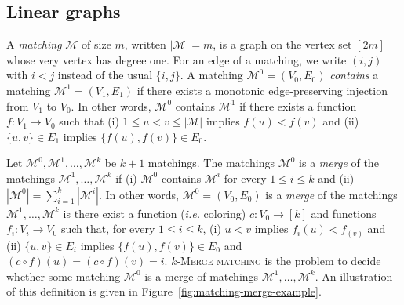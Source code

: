\subsection*{\textbf{Linear graphs}}

A \emph{matching} $\mathcal{M}$ of size $m$, written $|\mathcal{M}| = m$, 
is a graph on the vertex set $[2m]$ whose very vertex has degree one.
For an edge of a matching, we write $(i, j)$ with $i < j$ instead of the usual $\{i, j\}$.
A matching $\mathcal{M}^0 = (V_0, E_0)$ \emph{contains} a matching 
$\mathcal{M}^1 = (V_1, E_1)$ if there exists a monotonic edge-preserving injection from $V_1$ to $V_0$.
In other words, $\mathcal{M}^0$ contains $\mathcal{M}^1$ if there exists a function 
$f : V_1 \to V_0$ such that 
(i) $1 \leq u < v \leq |\mathcal{M}|$ implies $f(u) < f(v)$ and  
(ii) $\{u, v\} \in E_1$ implies $\{f(u), f(v)\} \in E_0$.

Let $\mathcal{M}^0, \mathcal{M}^1, \dots, \mathcal{M}^k$ be $k+1$ matchings.
The matchings $\mathcal{M}^0$ is a \emph{merge} of the matchings 
$\mathcal{M}^1, \dots, \mathcal{M}^k$ 
if 
(i) $\mathcal{M}^0$ contains $\mathcal{M}^i$ for every $1 \leq i \leq k$ 
and (ii) $\left|\mathcal{M}^0\right| = \sum_{i=1}^{k} \left|\mathcal{M}^i\right|$.
In other words,  $\mathcal{M}^0 = (V_0, E_0)$ is a \emph{merge} of the matchings 
$\mathcal{M}^1, \dots, \mathcal{M}^k$ is there exist a function (\emph{i.e.} coloring)
$c : V_0 \to [k]$  and functions $f_i : V_i \to V_0$ such that, for every $1 \leq i \leq k$,
(i) $u < v$ implies $f_i(u) < f_(v)$ and  
(ii) $\{u, v\} \in E_i$ implies $\{f(u), f(v)\} \in E_0$ and $(c \circ f)(u) = (c \circ f)(v) = i$.
\textsc{$k$-Merge matching} is the problem to decide whether some matching 
$\mathcal{M}^0$ is a merge of matchings $\mathcal{M}^1, \dots, \mathcal{M}^k$.
An illustration of this definition is given in Figure~\ref{fig:matching-merge-example}.


